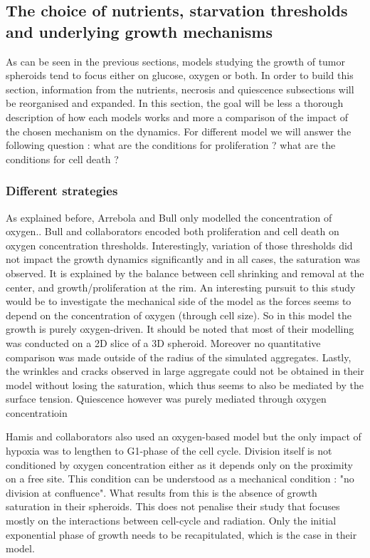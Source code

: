 \documentclass[11pt,a4paper]{article}
\begin{document}
\subsection{The choice of nutrients, starvation thresholds and underlying growth mechanisms}
As can be seen in the previous sections, models studying the growth of tumor spheroids tend to focus either on glucose, oxygen or both. In order to build this section, information from the nutrients,  necrosis and quiescence subsections will be reorganised and expanded. In this section, the goal will be less a thorough description of how each models works and more a comparison of the impact of the chosen mechanism on the dynamics. For different model we will answer the following question : what are the conditions for proliferation ? what are the conditions for cell death ?

\subsubsection{Different strategies}
As explained before, Arrebola and Bull only modelled the concentration of oxygen.\cite{Arrebola2020}\cite{Bull2020}. Bull and collaborators encoded both proliferation and cell death on oxygen concentration thresholds.\cite{Bull2020} Interestingly, variation of those thresholds did not impact the growth dynamics significantly and in all cases, the saturation was observed. It is explained by the balance between cell shrinking and removal at the center, and growth/proliferation at the rim. An interesting pursuit to this study would be to investigate the mechanical side of the model as the forces seems to depend on the concentration of oxygen (through cell size). So in this model the growth is purely oxygen-driven. It should be noted that most of their modelling was conducted on a 2D slice of a 3D spheroid. Moreover no quantitative comparison was made outside of the radius of the simulated aggregates. Lastly, the wrinkles and cracks observed in large aggregate could not be obtained in their model without losing the saturation, which thus seems to also be mediated by the surface tension. Quiescence however was purely mediated through oxygen concentratioin

Hamis and collaborators also used an oxygen-based model but the only impact of hypoxia was to lengthen to  G1-phase of the cell cycle.\cite{Hamis2020} Division itself is not conditioned by oxygen concentration either as it depends only on the proximity on a free site. This condition can be understood as a mechanical condition : "no division at confluence". What results from this is the absence of growth saturation in their spheroids. This does not penalise their study that focuses mostly on the interactions between cell-cycle and radiation. Only the initial exponential phase of growth needs to be recapitulated, which is the case in their model. 
\end{document}
